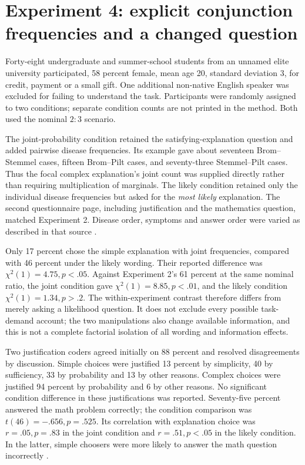 \section{Experiment 4: explicit conjunction frequencies and a changed question}
\label{sec:p19-explanation-experiment-four}

Forty-eight undergraduate and summer-school students from an
unnamed elite university participated, 58 percent female, mean
age 20, standard deviation 3, for credit, payment or a small gift.
One additional non-native English speaker was excluded for failing
to understand the task.
Participants were randomly assigned to two conditions; separate
condition counts are not printed in the method.
Both used the nominal \(2:3\) scenario.

The joint-probability condition retained the satisfying-explanation
question and added pairwise disease frequencies. Its example gave
about seventeen Brom--Stemmel cases, fifteen Brom--Pilt cases,
and seventy-three Stemmel--Pilt cases. Thus the focal complex
explanation's joint count was supplied directly rather than
requiring multiplication of marginals.
The likely condition retained only the individual disease frequencies
but asked for the \emph{most likely} explanation.
The second questionnaire page, including justification and the
mathematics question, matched Experiment 2.
Disease order, symptoms and answer order were varied as described
in that source \cite[pp.~250--251]{Lombrozo2007SimplicityProbability}.

Only 17 percent chose the simple explanation with joint frequencies,
compared with 46 percent under the likely wording.
Their reported difference was \(\chi^2(1)=4.75,p<.05\).
Against Experiment 2's 61 percent at the same nominal ratio,
the joint condition gave \(\chi^2(1)=8.85,p<.01\), and the
likely condition \(\chi^2(1)=1.34,p>.2\).
The within-experiment contrast therefore differs from merely
asking a likelihood question. It does not exclude every possible
task-demand account; the two manipulations also change available
information, and this is not a complete factorial isolation of
all wording and information effects.

Two justification coders agreed initially on 88 percent and
resolved disagreements by discussion.
Simple choices were justified 13 percent by simplicity,
40 by sufficiency, 33 by probability and 13 by other reasons.
Complex choices were justified 94 percent by probability and
6 by other reasons. No significant condition difference in
these justifications was reported.
Seventy-five percent answered the math problem correctly;
the condition comparison was \(t(46)=-.656,p=.525\).
Its correlation with explanation choice was \(r=.05,p=.83\)
in the joint condition and \(r=.51,p<.05\) in the likely condition.
In the latter, simple choosers were more likely to answer the
math question incorrectly
\cite[pp.~251--252]{Lombrozo2007SimplicityProbability}.

